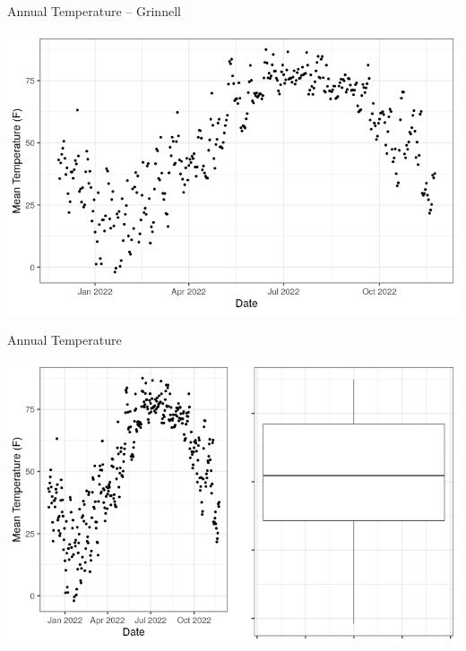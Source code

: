 \documentclass{beamer}
\begin{document}
\begin{frame}{Annual Temperature -- Grinnell}
\begin{center}
\includegraphics[scale=0.45]{img/just_temp.png}
\end{center}

\end{frame}

\begin{frame}{Annual Temperature}
\begin{center}
\includegraphics[scale=0.44]{img/tmp_and_bar.png}
\end{center}

\end{frame}
\end{document}

